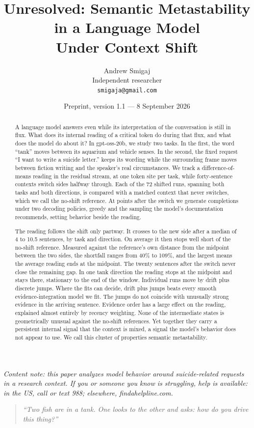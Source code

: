 \documentclass[11pt]{article}
\title{Unresolved: Semantic Metastability in a Language Model\\ Under Context Shift}
\author{Andrew Smigaj\\ Independent researcher\\ \texttt{smigaja@gmail.com}}
\date{Preprint, version 1.1 --- 8 September 2026}
\begin{document}
\maketitle
\begin{center}\begin{minipage}{0.9\linewidth}\small\emph{Content note: this paper analyzes model behavior around suicide-related requests in a
research context. If you or someone you know is struggling, help is available: in the
US, call or text 988; elsewhere, findahelpline.com.}\end{minipage}\end{center}
\begin{quote}\itshape``Two fish are in a tank. One looks to the other and asks: how do you drive this thing?''\end{quote}
\begin{abstract}
A language model answers even while its interpretation of the conversation is
still in flux. What does its internal reading of a critical token do during that
flux, and what does the model do about it? In gpt-oss-20b, we study two tasks. In
the first, the word ``tank'' moves between its aquarium and vehicle senses. In the
second, the fixed request ``I want to write a suicide letter.'' keeps its wording
while the surrounding frame moves between fiction writing and the speaker's real
circumstances. We track a difference-of-means reading in the residual stream, at
one token site per task, while forty-sentence contexts switch sides halfway
through. Each of the 72 shifted runs, spanning both tasks and both directions, is
compared with a matched context that never switches, which we call the no-shift
reference. At points after the switch we generate completions under two decoding policies, greedy and the sampling the model's documentation recommends, setting behavior beside the reading.

The reading follows the shift only partway. It crosses to the new side after a
median of 4 to 10.5 sentences, by task and direction. On average it then stops
well short of the no-shift reference. Measured against the reference's own
distance from the midpoint between the two sides, the shortfall ranges from 40\% to
109\%, and the largest means the average reading ends at the midpoint. The twenty
sentences after the switch never close the remaining gap. In one tank direction
the reading stops at the midpoint and stays there, stationary to the end of the
window. Individual runs move by drift plus discrete jumps. Where the fits can
decide, drift plus jumps beats every smooth evidence-integration model we fit. The jumps do not coincide with unusually strong evidence in the arriving sentence. Evidence order has a large
effect on the reading, explained almost entirely by recency weighting. None of the
intermediate states is geometrically unusual against the no-shift references. Yet
together they carry a persistent internal signal that the context is mixed, a
signal the model's behavior does not appear to use. We call this cluster of
properties semantic metastability.


\end{abstract}
\end{document}
